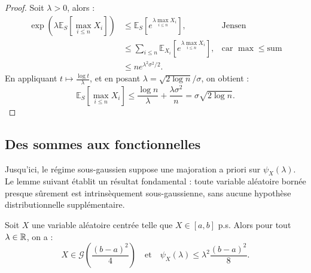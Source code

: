\begin{proof}
    Soit $ \lambda > 0$, alors :
    \begin{align*}
        \exp \left( \lambda \mathbb{E}_S \left[ \max_{i \leqslant n} X_i \right] \right) &\leqslant \mathbb{E}_S \left[ e^{ \lambda \max_{i \leqslant n} X_i }\right], &\text{Jensen}  \\ 
        & \leqslant \sum_{ i \leqslant n} \mathbb{E}_{X_i} \left[ e^{ \lambda \max_{i \leqslant n} X_i }\right], &\text{car } \max \leqslant \mathrm{sum} \\
        &\leqslant n e^{ \lambda^2 \sigma^2 / 2}. 
    \end{align*}
    En appliquant $ t \longmapsto \frac{\log t}{ \lambda}$, et en posant $ \lambda = \sqrt{ 2 \log n} / \sigma$, on obtient : 
    $$ 
        \mathbb{E}_S [ \max_{i \leqslant n} X_i ] \leqslant \frac{\log n}{ \lambda} + \frac{ \lambda \sigma^2}{n} = \sigma \sqrt{2 \log n}. 
    $$
\end{proof}

\subsection{Des sommes aux fonctionnelles}

Jusqu'ici, le régime sous-gaussien suppose une majoration a priori sur $\psi_X(\lambda)$. Le lemme suivant établit un résultat fondamental : toute variable aléatoire bornée presque sûrement est intrinsèquement sous-gaussienne, sans aucune hypothèse distributionnelle supplémentaire.

\begin{lemma}[Hoeffding]
    Soit $X$ une variable aléatoire centrée telle que $ X \in [a,b]$ p.s. Alors pour tout $ \lambda \in \mathbb{R}$, on a :
    \begin{equation}
        X \in \mathcal{G} \left( \frac{(b-a)^2}{4}\right) \quad \text{et} \quad \psi_X( \lambda) \leqslant \lambda^2 \frac{(b-a)^2}{8}. 
    \end{equation}
\end{lemma}

